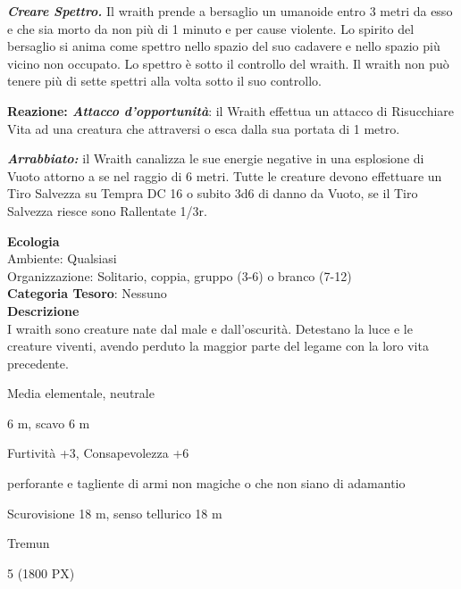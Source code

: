 \begin{multicols}{2}
{\emph{\textbf{Creare Spettro.}} Il wraith prende a bersaglio un umanoide entro 3 metri da esso e che sia morto da non più di 1 minuto e per cause violente. Lo spirito del bersaglio si anima come spettro nello spazio del suo cadavere e nello spazio più vicino non occupato. Lo spettro è sotto il controllo del wraith. Il wraith non può tenere più di sette spettri alla volta sotto il suo controllo.

\textbf{Reazione: \emph{Attacco d'opportunità}}: il Wraith effettua un attacco di Risucchiare Vita ad una creatura che attraversi o esca dalla sua portata di 1 metro.

\emph{\textbf{Arrabbiato:}} il Wraith canalizza le sue energie negative in una esplosione di Vuoto attorno a se nel raggio di 6 metri. Tutte le creature devono effettuare un Tiro Salvezza su Tempra DC 16 o subito 3d6 di danno da Vuoto, se il Tiro Salvezza riesce sono Rallentate 1/3r.

\textbf{Ecologia}\\
Ambiente: Qualsiasi\\
Organizzazione: Solitario, coppia, gruppo (3-6) o branco (7-12)\\
\textbf{Categoria Tesoro}: Nessuno\\
\textbf{Descrizione}\\
I wraith sono creature nate dal male e dall'oscurità. Detestano la luce e le creature viventi, avendo perduto la maggior parte del legame con la loro vita precedente.


\begin{description}[noitemsep, topsep=0pt, parsep=0pt, partopsep=0pt, itemsep=1pt, leftmargin=2.35cm,  labelwidth=2.2cm, itemindent=0cm, listparindent=0pt] %
\setlength{\baselineskip}{10pt}
\item[\textbf{Taglia/Tipo}] Media elementale, neutrale
\item[\textbf{Caratt.}] 
\item[\textbf{Punti Ferita}] 
\item[\textbf{Movimento}] 6 m, scavo 6 m
\item[\textbf{Tiri Salvez.}] 
\item[\textbf{Comp.}] Furtività +3, Consapevolezza +6
\item[\textbf{Res. Danni}] perforante e tagliente di armi non magiche o che non siano di adamantio
\item[\textbf{Sensi}] Scurovisione 18 m, senso tellurico 18 m
\item[\textbf{Linguaggi}] Tremun
\item[\textbf{Sfida}] 5 (1800 PX)
\end{description}
\smallskip

}
\end{multicols}
